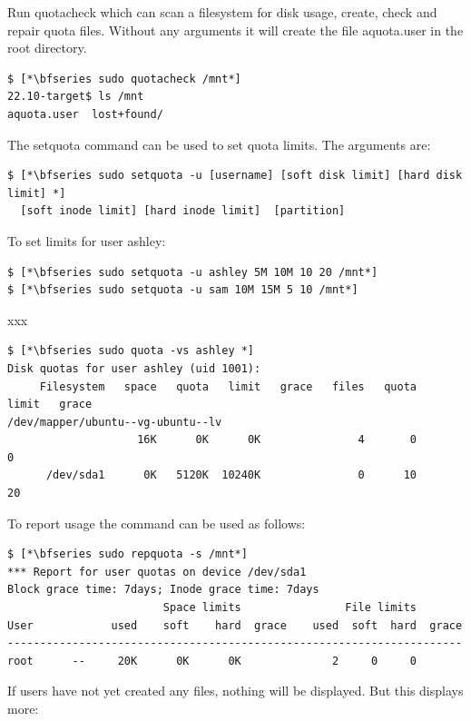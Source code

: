 \noindent 
Run quotacheck which can scan a filesystem for disk usage, create, check 
and repair quota files. Without any arguments it will create the file aquota.user in the root directory.

\begin{lstlisting}
$ [*\bfseries sudo quotacheck /mnt*]
22.10-target$ ls /mnt
aquota.user  lost+found/
\end{lstlisting}

\noindent 
The setquota command can be used to set quota limits. The arguments are:

\begin{lstlisting}
$ [*\bfseries sudo setquota -u [username] [soft disk limit] [hard disk limit] *]
  [soft inode limit] [hard inode limit]  [partition]
\end{lstlisting}

\noindent 
To set limits for user ashley:

\begin{lstlisting}
$ [*\bfseries sudo setquota -u ashley 5M 10M 10 20 /mnt*]
$ [*\bfseries sudo setquota -u sam 10M 15M 5 10 /mnt*]
\end{lstlisting}

\noindent
xxx

\begin{lstlisting}
$ [*\bfseries sudo quota -vs ashley *]
Disk quotas for user ashley (uid 1001): 
     Filesystem   space   quota   limit   grace   files   quota   limit   grace
/dev/mapper/ubuntu--vg-ubuntu--lv
                    16K      0K      0K               4       0       0        
      /dev/sda1      0K   5120K  10240K               0      10      20 
\end{lstlisting}

\noindent 
To report usage the  command can be used as follows:

\begin{lstlisting}
$ [*\bfseries sudo repquota -s /mnt*]
*** Report for user quotas on device /dev/sda1
Block grace time: 7days; Inode grace time: 7days
                        Space limits                File limits
User            used    soft    hard  grace    used  soft  hard  grace
----------------------------------------------------------------------
root      --     20K      0K      0K              2     0     0  
\end{lstlisting}

\noindent 
If users have not yet created any files, nothing will be displayed. But this displays more:

